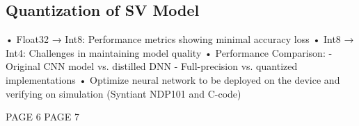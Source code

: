 \subsection{Quantization of SV Model}
\label{sec:quantization}
• Float32 → Int8: Performance metrics showing minimal accuracy loss\newline
• Int8 → Int4: Challenges in maintaining model quality\newline
• Performance Comparison:\newline
    - Original CNN model vs. distilled DNN\newline
    - Full-precision vs. quantized implementations\newline
• Optimize neural network to be deployed on the device and verifying on simulation (Syntiant NDP101 and C-code)\newline\newline

\newpage
PAGE 6
\newpage 
PAGE 7
\newpage 